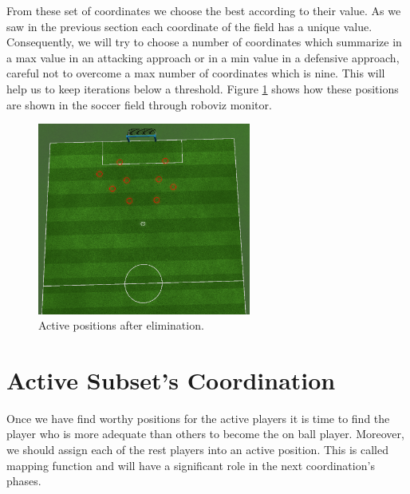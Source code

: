 From these set of coordinates we choose the best according to their value. As we saw in the previous section each coordinate of the field has a unique value. Consequently, we will try to choose a number of coordinates which summarize in a max value in an attacking approach or in a min value in a defensive approach, careful not to overcome a max number of coordinates which is nine. This will help us to keep iterations below a threshold. Figure \ref{fig:ActivePositions3} shows how these positions are shown in the soccer field through roboviz monitor. 
\begin{figure}[htb!]
\centering
  \includegraphics[width=7cm]{Chapter4/figures/Active3.png}
  \caption{Active positions after elimination.} 
  \label{fig:ActivePositions3}
\end{figure}


\section{Active Subset's Coordination}
Once we have find worthy positions for the active players it is time to find the player who is more adequate than others to become the on ball player. Moreover, we should assign each of the rest players into an active position. This is called mapping function and will have a significant role in the next coordination's phases. 
